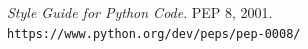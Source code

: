 \documentclass{tufte-handout}
\begin{document}
\begin{thebibliography}{9}

\emph{Style Guide for Python Code}.
PEP 8, 2001.\\
\verb"https://www.python.org/dev/peps/pep-0008/"

\end{thebibliography}

%


\end{document}
